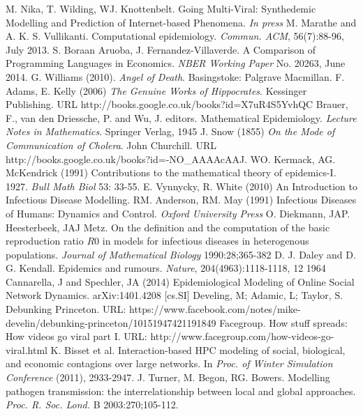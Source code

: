 \documentclass[11pt, a4paper, oneside,titlepage]{article}
\begin{document}
\begin{thebibliography}{1}
	M. Nika, T. Wilding, WJ. Knottenbelt. Going Multi-Viral: Synthedemic Modelling and Prediction of Internet-based Phenomena. \emph{In press}
	M. Marathe and A. K. S. Vullikanti. Computational
        epidemiology. \emph{Commun. ACM}, 56(7):88-96, July 2013.
         S. Boraan Aruoba,
          J. Fernandez-Villaverde. A Comparison of Programming
          Languages in Economics. \emph{NBER Working Paper} No. 20263,
          June 2014.
	G. Williams (2010). \emph{Angel of Death}. Basingstoke: Palgrave Macmillan.
	F. Adams, E. Kelly (2006) \emph{The Genuine Works of Hippocrates}. Kessinger Publishing. URL http://books.google.co.uk/books?id=X7uR4S5YvhQC
	 Brauer, F., van den Driessche, P. and Wu, J. editors.  Mathematical Epidemiology. \emph{Lecture Notes in Mathematics}. Springer Verlag, 1945 
	J. Snow (1855) \emph{On the Mode of Communication of Cholera}. John Churchill. URL http://books.google.co.uk/books?id=-NO\_AAAAcAAJ.
	WO. Kermack, AG. McKendrick (1991) Contributions to the mathematical theory of epidemics-I. 1927. \emph{Bull Math Biol} 53: 33-55.
	E. Vynnycky, R. White (2010) An Introduction to Infectious Disease Modelling.
	RM. Anderson, RM. May (1991) Infectious Diseases of Humans: Dynamics and Control. \emph{Oxford University Press}
	O. Diekmann, JAP. Heesterbeek, JAJ Metz. On the definition and the computation of the basic reproduction ratio $R0$ in models for infectious diseases in heterogenous populations. \emph{Journal of Mathematical Biology} 1990:28;365-382
	D. J. Daley and D. G. Kendall. Epidemics and rumours. \emph{Nature}, 204(4963):1118-1118, 12 1964
	Cannarella, J and Spechler, JA (2014) Epidemiological Modeling of Online Social Network Dynamics. arXiv:1401.4208 [cs.SI]
Develing, M; Adamic, L; Taylor, S. Debunking Princeton. URL: https://www.facebook.com/notes/mike-develin/debunking-princeton/10151947421191849
	Facegroup. How stuff spreads: How videos go viral part I. URL: http://www.facegroup.com/how-videos-go-viral.html	
	K. Bisset et al. Interaction-based HPC modeling of social, biological, and economic contagions over large networks. In \emph{Proc. of Winter Simulation Conference} (2011), 2933-2947.
	J. Turner, M. Begon, RG. Bowers. Modelling pathogen transmission: the interrelationship between local and global approaches. \emph{Proc. R. Soc. Lond.} B 2003:270;105-112.

\end{thebibliography}
\end{document}
